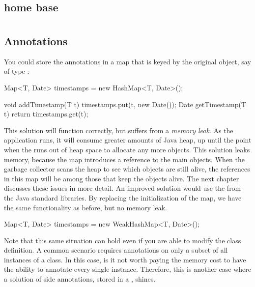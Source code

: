 \subsection{home base}

\section{}
\subsection{Annotations}

You could store the annotations in a map that is keyed by the
original object, say of type :

\begin{shortlisting}
Map<T, Date> timestamps = new HashMap<T, Date>();

void addTimestamp(T t) {
	timestamps.put(t, new Date());
}
Date getTimestamp(T t) {
	return timestamps.get(t);
}
\end{shortlisting}

This solution will function correctly, but suffers from a \emph{memory
leak}. As the application runs, it will consume greater
amounts of Java heap, up until the point when the \jre runs out of heap space to
allocate any more objects. This solution leaks memory, because the
 map introduces a reference to the main objects. When the
garbage collector scans the heap to see which objects are still alive, the
references in this map will be among those that keep the objects alive. The next
chapter discusses these issues in more detail. An improved solution would use the
 from the Java standard libraries. By replacing the
initialization of the  map, we have the same functionality as
before, but no memory leak.

\begin{shortlisting}
Map<T, Date> timestamps = new WeakHashMap<T, Date>();
\end{shortlisting}

Note that this same situation can hold even if you are able to modify the class
definition. A common scenario requires annotations on only a subset of all
instances of a class. In this case, is it not worth paying the memory cost to
have the ability to annotate every single instance. Therefore, this is another
case where a solution of side annotations, stored in a ,
shines.

